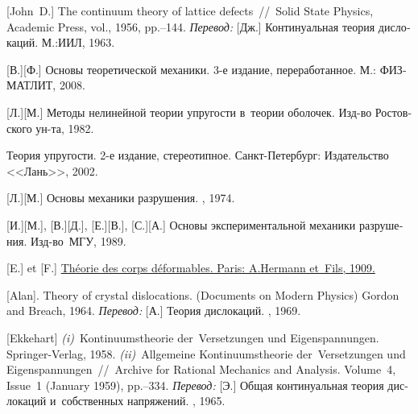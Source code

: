 \begin{thebibliography}{123}
\begin{otherlanguage}{russian}
[John~D.] The continuum theory of lattice defects~//~Solid State Physics, Academic Press, vol., 1956, pp.\hbox{--}144.
\emph{Перевод:} [Дж.] Континуальная теория дислокаций. М.:\;ИИЛ, 1963. 

[В.][Ф.]
Основы теоретической механики.
3-е издание, переработанное.
М.: ФИЗМАТЛИТ,
2008.

[Л.][М.]
Методы нелинейной теории упругости в~теории оболочек.
Изд\hbox{-}во Ростовского ун\hbox{-}та, 1982.

Теория упругости.
2-е издание, стереотипное.
{Санкт-Петербург}:
Издательство <<Лань>>, 2002.

[Л.][М.]
Основы механики разрушения.
\naukapublisher,
1974.

[И.][М.], [В.][Д.], [Е.][В.], [С.][А.]
Основы экспериментальной механики разрушения. Изд\hbox{-}во~МГУ, 1989. 

[E.] et [F.]
\href{
   https://jscholarship.library.jhu.edu/bitstream/handle/1774.2/34209/31151000327233.pdf
}{
   Théorie des corps déformables.
   Paris:
   A.\:Hermann et~Fils,
   1909.
}

[Alan]. Theory of crystal dislocations. (Documents on Modern Physics) Gordon and Breach, 1964. 
\emph{Перевод:} [А.] Теория дислокаций. \mirpublisher, 1969. 

[Ekkehart] \emph{(i)}~Kontinuumstheorie der~Versetzungen und Eigen\-spannung\-en. Springer\hbox{-}Verlag, 1958. 
\emph{(ii)}~Allgemeine Kontinuumstheorie der~Versetzungen und Eigen\-span\-nung\-en~//~Archive for Rational Mechanics and Analysis. Volume~4, Issue~1 (January 1959), pp.\hbox{--}334.
\emph{Перевод:} [Э.] Общая континуальная теория дислокаций и~собственных напряжений. \mirpublisher, 1965. 


\end{otherlanguage}
\end{thebibliography}

